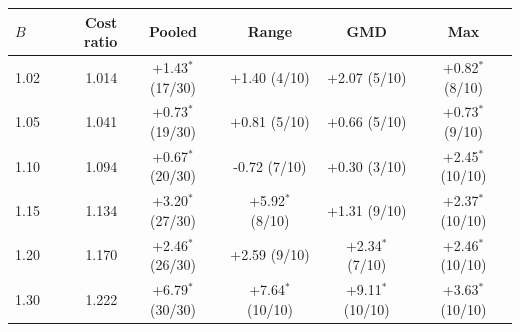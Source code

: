 \begin{tabular}{lrcccc}
\toprule
$B$ & Cost ratio & Pooled & Range & GMD & Max \\
\midrule
1.02 & 1.014 & +1.43$^\ast$ (17/30) & +1.40 (4/10) & +2.07 (5/10) & +0.82$^\ast$ (8/10) \\
1.05 & 1.041 & +0.73$^\ast$ (19/30) & +0.81 (5/10) & +0.66 (5/10) & +0.73$^\ast$ (9/10) \\
1.10 & 1.094 & +0.67$^\ast$ (20/30) & -0.72 (7/10) & +0.30 (3/10) & +2.45$^\ast$ (10/10) \\
1.15 & 1.134 & +3.20$^\ast$ (27/30) & +5.92$^\ast$ (8/10) & +1.31 (9/10) & +2.37$^\ast$ (10/10) \\
1.20 & 1.170 & +2.46$^\ast$ (26/30) & +2.59 (9/10) & +2.34$^\ast$ (7/10) & +2.46$^\ast$ (10/10) \\
1.30 & 1.222 & +6.79$^\ast$ (30/30) & +7.64$^\ast$ (10/10) & +9.11$^\ast$ (10/10) & +3.63$^\ast$ (10/10) \\
\bottomrule
\end{tabular}

